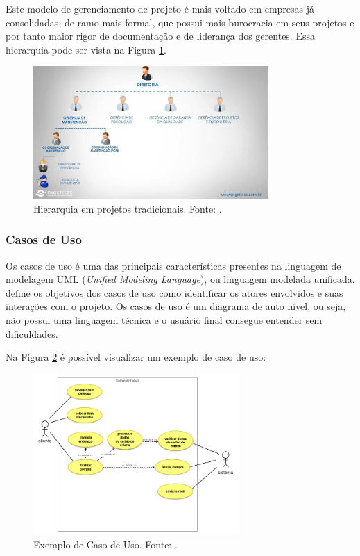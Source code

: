 Este modelo de gerenciamento de projeto é mais voltado em empresas já consolidadas, de ramo mais formal, que possui mais burocracia em seus projetos e por tanto maior rigor de documentação e de liderança dos gerentes. Essa hierarquia pode ser vista na Figura \ref{img:gerencia_de_projetos_tradicional}.

\begin{figure}[H]
	\centering
	\includegraphics[width=0.8\textwidth]{figuras/gerencia_de_projeto.jpg}
	\caption{Hierarquia em projetos tradicionais. Fonte: .}
	\label{img:gerencia_de_projetos_tradicional}
\end{figure}

\subsubsection{Casos de Uso}
\label{sec:casos_de_uso}

Os casos de uso é uma das principais características presentes na linguagem de modelagem UML (\textit{Unified Modeling Language}), ou linguagem modelada unificada.  define os objetivos dos casos de uso como identificar os atores envolvidos e suas interações com o projeto. Os casos de uso é um diagrama de auto nível, ou seja, não possui uma linguagem técnica e o usuário final consegue entender sem dificuldades.

Na Figura \ref{img:exemplo_caso_de_uso} é possível visualizar um exemplo de caso de uso:

\begin{figure}[H]
	\centering
	\includegraphics[width=0.7\textwidth]{figuras/caso_de_uso_exemplo.png}
	\caption{Exemplo de Caso de Uso. Fonte: .}
	\label{img:exemplo_caso_de_uso}
\end{figure}

